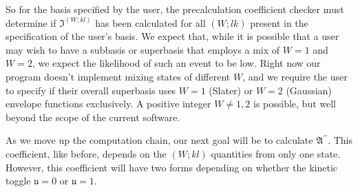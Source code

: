 So for the basis specified by the user, the precalculation coefficient checker
must determine if $ \bm{\mathfrak{I}}^{\left(W;kl\right)} $ has been calculated
for all $ \left( W; lk \right) $ present in the specification of the user's
basis. We expect that, while it is possible that a user may wish to have a
subbasis or superbasis that employs a mix of $W = 1$ and $W = 2$, we expect the
likelihood of such an event to be low. Right now our program doesn't implement
mixing states of different $W$, and we require the user to specify if their
overall superbasis uses $W = 1$ (Slater) or $W = 2$ (Gaussian) envelope
functions exclusively. A positive integer $W \ne 1,2$ is possible, but well
beyond the scope of the current software.

As we move up the computation chain, our next goal will be to calculate
$\mathfrak{A}^{\prime\prime}$. This coefficient, like before, depends on the
$\left(W;kl\right)$ quantities from only one state. However, this coefficient
will have two forms depending on whether the kinetic toggle $\mathfrak{u} =
0$ or $\mathfrak{u}=1$. 

